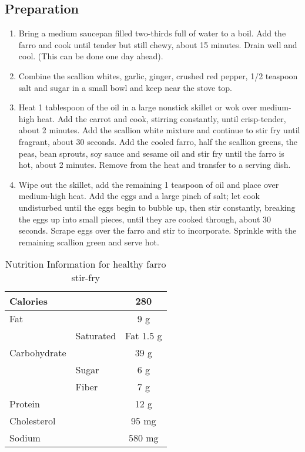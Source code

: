 \subsection{Preparation}
\begin{enumerate}
    \item Bring a medium saucepan filled two-thirds full of water to a boil. Add the farro and cook until tender but still chewy, about 15 minutes. Drain well and cool. (This can be done one day ahead).
    \item Combine the scallion whites, garlic, ginger, crushed red pepper, 1/2 teaspoon salt and sugar in a small bowl and keep near the stove top.
    \item Heat 1 tablespoon of the oil in a large nonstick skillet or wok over medium-high heat. Add the carrot and cook, stirring constantly, until crisp-tender, about 2 minutes. Add the scallion white mixture and continue to stir fry until fragrant, about 30 seconds. Add the cooled farro, half the scallion greens, the peas, bean sprouts, soy sauce and sesame oil and stir fry until the farro is hot, about 2 minutes. Remove from the heat and transfer to a serving dish.
    \item Wipe out the skillet, add the remaining 1 teaspoon of oil and place over medium-high heat. Add the eggs and a large pinch of salt; let cook undisturbed until the eggs begin to bubble up, then stir constantly, breaking the eggs up into small pieces, until they are cooked through, about 30 seconds. Scrape eggs over the farro and stir to incorporate. Sprinkle with the remaining scallion green and serve hot.
\end{enumerate}

\begin{table}%
    \centering
    \begin{tabular}{|ll|c|}
        \hline
        Calories & & 280\\
        \hline
        Fat & & 9 g\\
        \hline
         & Saturated & Fat 1.5 g\\
        \hline
        Carbohydrate & & 39 g\\
        \hline
         & Sugar & 6 g\\
         & Fiber & 7 g\\
        \hline
        Protein & & 12 g\\
        \hline
        Cholesterol & & 95 mg\\
        \hline
        Sodium & & 580 mg\\
        \hline
    \end{tabular}
    \caption{Nutrition Information for healthy farro stir-fry}
\end{table}
